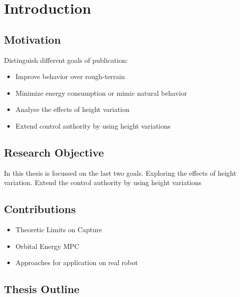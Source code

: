 %
\chapter{Introduction} \label{chap::intro}
\section{Motivation}
Distinguish different goals of publication: \cite{koolen2016balance}
\begin{itemize}
	\item Improve behavior over rough-terrain
	\item Minimize energy consumption or mimic natural behavior
	\item Analyse the effects of height variation
	\item Extend control authority by using height variations
\end{itemize}
\section{Research Objective}
In this thesis is focussed on the last two goals. Exploring the effects of height variation. Extend the control authority by using height variations
\section{Contributions}
\begin{itemize}
	\item Theoretic Limits on Capture
	\item Orbital Energy MPC
	\item Approaches for application on real robot
\end{itemize}
\section{Thesis Outline}


